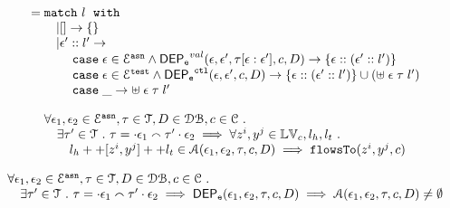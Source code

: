 \begin{defn}
\[\begin{array}{l}
	= 
	\ematch~  l ~ \ewith
	\\ \qquad
	| [] \to \{\}
	\\ \qquad
	|  \event' :: l' \to  
	\\ \quad \qquad 	
	\ecase \event \in \eventset^{\asn}  \land \eventdep^{val}(\event, \event', \trace[\event:\event'], c, D)
	\to \left\{ \event::(\event' :: l') \right\}
	\\ \quad \qquad 	
	\ecase \event \in \eventset^{\test} \land \eventdep^{\ctl}(\event, \event', c, D)
	\to \left\{ \event::(\event' :: l') \right\}\cup 
	\left( \uplus \eapp  \event  \eapp \trace  \eapp l' \right)
	\\ \quad \qquad 	
	\ecase \_ \to \uplus \eapp  \event  \eapp \trace  \eapp l'  
\end{array}
\]
\end{defn}
%
\begin{thm}
\label{thm:alg_correct}
\[
\begin{array}{l}
  \forall \mathtt{\epsilon}_1, \mathtt{\epsilon}_2 \in \mathcal{E}^{\mathtt{{asn}}}, \mathtt{\tau} \in \mathcal{T}, D \in \mathcal{DB} , c \in \mathcal{C} ~.~
  \\ \quad 
   \exists \mathtt{\tau}' \in \mathcal{T} ~.~ \mathtt{\tau} = \cdot \mathtt{\epsilon}_1 \smallfrown \mathtt{\tau}' \cdot \mathtt{\epsilon}_2
   \implies    \forall  z^i, y^j \in \mathbb{LV}_c, l_h, l_t ~.~ 
  \\ \qquad 
   l_h ++ [z^i, y^j] ++ l_t \in \mathcal{A}(\mathtt{\epsilon}_1, \mathtt{\epsilon}_2, \mathtt{\tau}, c, D)
   \implies \mathtt{flowsTo}(z^i, y^j, c)
\end{array}
\]
\end{thm}
%
%
\begin{thm}
\label{thm:algeventdep_sound}
\[
\begin{array}{l}
  \forall \mathtt{\epsilon}_1, \mathtt{\epsilon}_2 \in \mathcal{E}^{\mathtt{{asn}}}, \mathtt{\tau} \in \mathcal{T}, D \in \mathcal{DB} , c \in \mathcal{C} ~.~
  \\ \quad 
   \exists \mathtt{\tau}' \in \mathcal{T} ~.~ \mathtt{\tau} = \cdot \mathtt{\epsilon}_1 \smallfrown \mathtt{\tau}' \cdot \mathtt{\epsilon}_2
  \implies \mathsf{DEP_{\mathtt{e}}}(\mathtt{\epsilon}_1, \mathtt{\epsilon}_2, \mathtt{\tau}, {c}, D)
   \implies
   \mathcal{A}(\mathtt{\epsilon}_1, \mathtt{\epsilon}_2, \mathtt{\tau}, c, D) \neq \emptyset
\end{array}
\]
\end{thm}
%
